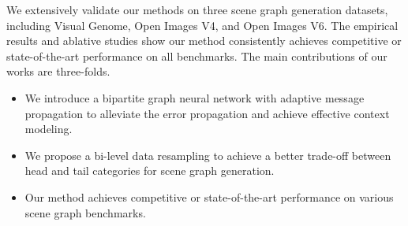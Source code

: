 We extensively validate our methods on three scene graph generation datasets, including Visual Genome, Open Images V4, and Open Images V6. 
The empirical results and ablative studies show our method consistently achieves competitive or state-of-the-art performance on all benchmarks. The main contributions of our works are three-folds.
\begin{itemize}[noitemsep,topsep=0pt]
	\item We introduce a bipartite graph neural network with adaptive message propagation to alleviate the error propagation and achieve effective context modeling.
	\item We propose a bi-level data resampling to achieve a better trade-off between head and tail categories for scene graph generation.
    \item Our method achieves competitive or state-of-the-art performance on various scene graph benchmarks.
\end{itemize}







